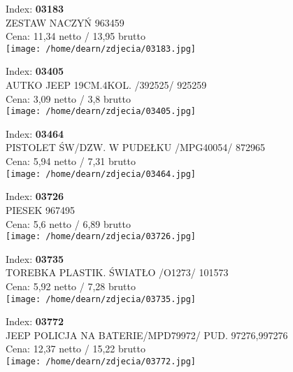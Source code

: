 {Index: \textbf{03183}\\
ZESTAW NACZYŃ 963459\\
Cena: 11,34 netto / 13,95 brutto\\
  \texttt{[image: /home/dearn/zdjecia/03183.jpg]}}\newline\newline

{Index: \textbf{03405}\\
AUTKO JEEP 19CM.4KOL. /392525/                  925259\\
Cena: 3,09 netto / 3,8 brutto\\
  \texttt{[image: /home/dearn/zdjecia/03405.jpg]}}\newline\newline

{Index: \textbf{03464}\\
PISTOLET ŚW/DZW. W PUDEŁKU /MPG40054/           872965\\
Cena: 5,94 netto / 7,31 brutto\\
  \texttt{[image: /home/dearn/zdjecia/03464.jpg]}}\newline\newline

{Index: \textbf{03726}\\
PIESEK 967495\\
Cena: 5,6 netto / 6,89 brutto\\
  \texttt{[image: /home/dearn/zdjecia/03726.jpg]}}\newline\newline

{Index: \textbf{03735}\\
TOREBKA PLASTIK. ŚWIATŁO  /O1273/               101573\\
Cena: 5,92 netto / 7,28 brutto\\
  \texttt{[image: /home/dearn/zdjecia/03735.jpg]}}\newline\newline

{Index: \textbf{03772}\\
JEEP POLICJA NA BATERIE/MPD79972/ PUD.    97276,997276\\
Cena: 12,37 netto / 15,22 brutto\\
  \texttt{[image: /home/dearn/zdjecia/03772.jpg]}}\newline\newline

